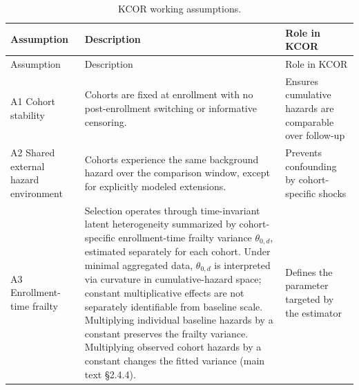 \documentclass[
]{article}
\begin{document}
\begin{longtable}[]{@{}
  >{\raggedright\arraybackslash}p{}
  >{\raggedright\arraybackslash}p{}
  >{\raggedright\arraybackslash}p{}@{}}
\caption{KCOR working assumptions.}\label{tbl:si_assumptions}\tabularnewline
\toprule\noalign{}
\begin{minipage}[b]{\linewidth}\raggedright
Assumption
\end{minipage} & \begin{minipage}[b]{\linewidth}\raggedright
Description
\end{minipage} & \begin{minipage}[b]{\linewidth}\raggedright
Role in KCOR
\end{minipage} \\
\midrule\noalign{}
\endfirsthead
\toprule\noalign{}
\begin{minipage}[b]{\linewidth}\raggedright
Assumption
\end{minipage} & \begin{minipage}[b]{\linewidth}\raggedright
Description
\end{minipage} & \begin{minipage}[b]{\linewidth}\raggedright
Role in KCOR
\end{minipage} \\
\midrule\noalign{}
\endhead
\bottomrule\noalign{}
\endlastfoot
A1 Cohort stability & Cohorts are fixed at enrollment with no post-enrollment switching or informative censoring. & Ensures cumulative hazards are comparable over follow-up \\
A2 Shared external hazard environment & Cohorts experience the same background hazard over the comparison window, except for explicitly modeled extensions. & Prevents confounding by cohort-specific shocks \\
A3 Enrollment-time frailty & Selection operates through time-invariant latent heterogeneity summarized by cohort-specific enrollment-time frailty variance \(\theta_{0,d}\), estimated separately for each cohort. Under minimal aggregated data, \(\theta_{0,d}\) is interpreted via curvature in cumulative-hazard space; constant multiplicative effects are not separately identifiable from baseline scale. Multiplying individual baseline hazards by a constant preserves the frailty variance. Multiplying observed cohort hazards by a constant changes the fitted variance (main text §2.4.4). & Defines the parameter targeted by the estimator \\

\end{longtable}
\end{document}
